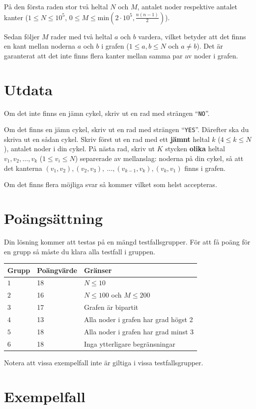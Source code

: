 På den första raden stor två heltal $N$ och $M$, antalet noder respektive antalet kanter
($1\le N \le 10^5$, $0\le M \le \mathrm{min}(2\cdot 10^5, \tfrac{n(n-1)}{2})$).

Sedan följer $M$ rader med två heltal $a$ och $b$ vardera, vilket betyder att det finns en kant mellan noderna $a$ och $b$ i grafen ($1\le a, b \le N$ och $a\neq b$). Det är garanterat att det inte finns flera kanter mellan samma par av noder i grafen.

\section*{Utdata}
Om det inte finns en jämn cykel, skriv ut en rad med strängen ``\texttt{NO}''.

Om det finns en jämn cykel, skriv ut en rad med strängen ``\texttt{YES}''. Därefter ska du skriva ut en sådan cykel. Skriv först ut en rad med ett \textbf{jämnt} heltal $k$ ($4\le k \le N$), antalet noder i din cykel. På nästa rad, skriv ut $K$ stycken \textbf{olika} heltal $v_{1}, v_{2}, \ldots, v_{k}$ ($1\le v_{i}\le N$) separerade av mellanslag: noderna på din cykel, så att det kanterna $(v_{1},v_{2}), (v_{2},v_{3}),\ \ldots, (v_{k-1},v_{k}), (v_{k}, v_{1})$ finns i grafen.

Om det finns flera möjliga svar så kommer vilket som helst accepteras.

\section*{Poängsättning}
Din lösning kommer att testas på en mängd testfallsgrupper.
För att få poäng för en grupp så måste du klara alla testfall i gruppen.

\noindent
\begin{tabular}{| l | l | l |}
  \hline
  Grupp & Poängvärde & Gränser \\ \hline \hline
  $1$ & 18 & $N\le 10$
  \\ \hline
  $2$ & 16 & $N\le 100$ och $M\le 200$
  \\ \hline
  $3$  & 17 & Grafen är bipartit
  \\ \hline
  $4$  & 13 & Alla noder i grafen har grad högst 2
  \\ \hline
  $5$  & 18 & Alla noder i grafen har grad minst 3
  \\ \hline
  $6$  & 18 & Inga ytterligare begränsningar
  \\ \hline
\end{tabular}

\noindent Notera att vissa exempelfall inte är giltiga i vissa testfallsgrupper.

\section*{Exempelfall}
